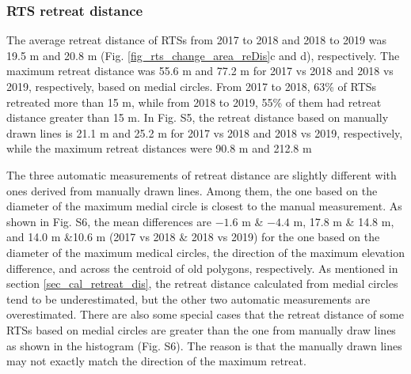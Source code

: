 \documentclass[authoryear,preprint,review,12pt]{elsarticle}
\begin{document}


\subsubsection{RTS retreat distance}
\label{sec_rts_retreat_distance}

The average retreat distance of RTSs from 2017 to 2018 and 2018 to 2019 was 19.5 m and 20.8 m (Fig. \ref{fig_rts_change_area_reDis}c and d), respectively. 
The maximum retreat distance was 55.6 m and 77.2 m for 2017 vs 2018 and 2018 vs 2019, respectively, based on medial circles. 
From 2017 to 2018, 63\% of RTSs retreated more than 15 m, while from 2018 to 2019, 55\% of them had retreat distance greater than 15 m. 
In Fig. S5, the retreat distance based on manually drawn lines is 21.1 m and 25.2 m for 2017 vs 2018 and 2018 vs 2019, respectively, while the maximum retreat distances were 90.8 m and 212.8 m

The three automatic measurements of retreat distance are slightly different with ones derived from manually drawn lines. Among them, the one based on the diameter of the maximum medial circle is closest to the manual measurement. 
As shown in Fig. S6, the mean differences are $-1.6$ m \& $-4.4$ m, 17.8 m \& 14.8 m, and 14.0 m \&10.6 m (2017 vs 2018 \& 2018 vs 2019) for the one based on the diameter of the maximum medical circles, the direction of the maximum elevation difference, and across the centroid of old polygons, respectively. 
As mentioned in section \ref{sec_cal_retreat_dis}, the retreat distance calculated from medial circles tend to be underestimated, but the other two automatic measurements are overestimated. 
There are also some special cases that the retreat distance of some RTSs based on medial circles are greater than the one from manually draw lines as shown in the histogram (Fig. S6).
The reason is that the manually drawn lines may not exactly match the direction of the maximum retreat.  
\end{document}
